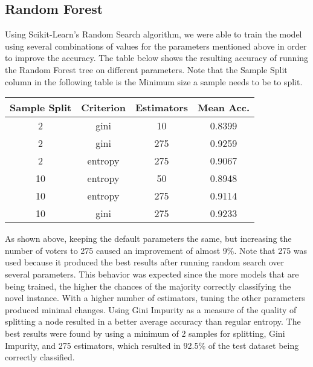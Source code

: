 \documentclass[fleqn,11pt]{article}
\begin{document}
\begin{multicols}{2}
        \subsection{Random Forest}
        Using Scikit-Learn’s Random Search algorithm, we were able to train the model using 
        several combinations of values for the parameters mentioned above in order to improve the 
        accuracy. The table below shows the resulting accuracy of running the Random Forest tree 
        on different parameters. Note that the Sample Split column in the following table is the 
        Minimum size a sample needs to be to split.
        \begin{center}
            \begin{tabular}{|c|c|c|c|}
                \hline
                Sample Split & Criterion & Estimators & Mean Acc. \\
                \hline
                2 & gini & 10 & 0.8399 \\
                2 & gini & 275 & 0.9259 \\
                2 & entropy & 275 & 0.9067 \\
                10 & entropy & 50 & 0.8948 \\
                10 & entropy & 275 & 0.9114 \\
                10 & gini & 275 & 0.9233 \\
                \hline
            \end{tabular}
        \end{center}
        As shown above, keeping the default parameters the same, but increasing the number of 
        voters to 275 caused an improvement of almost 9\%. Note that 275 was used because it 
        produced the best results after running random search over several parameters. This 
        behavior was expected since the more models that are being trained, the higher the chances 
        of the majority correctly classifying the novel instance. With a higher number of 
        estimators, tuning the other parameters produced minimal changes. Using Gini Impurity as a 
        measure of the quality of splitting a node resulted in a better average accuracy than 
        regular entropy. The best results were found by using a minimum of 2 samples for 
        splitting, Gini Impurity, and 275 estimators, which resulted in 92.5\% of the test dataset 
        being correctly classified.

\end{multicols}
\end{document}
